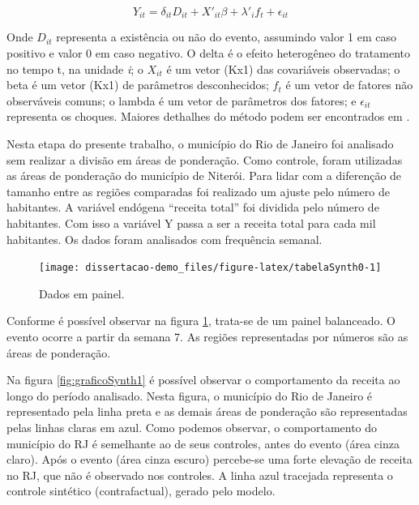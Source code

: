 \documentclass[
  12pt,
]{book}
\begin{document}
\begin{equation} 
  Y_{it} = \delta_{it}D_{it} + X'_{it}\beta + \lambda'_if_t + \epsilon_{it}
  \label{eq:gsc}
\end{equation}

Onde \(D_{it}\) representa a existência ou não do evento, assumindo valor 1 em caso positivo e valor 0 em caso negativo. O delta é o efeito heterogêneo do tratamento no tempo t, na unidade \emph{i}; o \(X_{it}\) é um vetor (Kx1) das covariáveis observadas; o beta é um vetor (Kx1) de parâmetros desconhecidos; \(f_{t}\) é um vetor de fatores não observáveis comuns; o lambda é um vetor de parâmetros dos fatores; e \(\epsilon_{it}\) representa os choques. Maiores dethalhes do método podem ser encontrados em \citet{xu_2017}.

Nesta etapa do presente trabalho, o município do Rio de Janeiro foi analisado sem realizar a divisão em áreas de ponderação. Como controle, foram utilizadas as áreas de ponderação do município de Niterói. Para lidar com a diferenção de tamanho entre as regiões comparadas foi realizado um ajuste pelo número de habitantes. A variável endógena ``receita total'' foi dividida pelo número de habitantes. Com isso a variável Y passa a ser a receita total para cada mil habitantes. Os dados foram analisados com frequência semanal.

\begin{figure}

{\centering \texttt{[image: dissertacao-demo\_files/figure-latex/tabelaSynth0-1]} 

}

\caption{Dados em painel.}\label{fig:tabelaSynth0}
\end{figure}

Conforme é possível observar na figura \ref{fig:tabelaSynth0}, trata-se de um painel balanceado. O evento ocorre a partir da semana 7. As regiões representadas por números são as áreas de ponderação.

Na figura \ref{fig:graficoSynth1} é possível observar o comportamento da receita ao longo do período analisado. Nesta figura, o município do Rio de Janeiro é representado pela linha preta e as demais áreas de ponderação são representadas pelas linhas claras em azul. Como podemos observar, o comportamento do município do RJ é semelhante ao de seus controles, antes do evento (área cinza claro). Após o evento (área cinza escuro) percebe-se uma forte elevação de receita no RJ, que não é observado nos controles. A linha azul tracejada representa o controle sintético (contrafactual), gerado pelo modelo.
\end{document}
